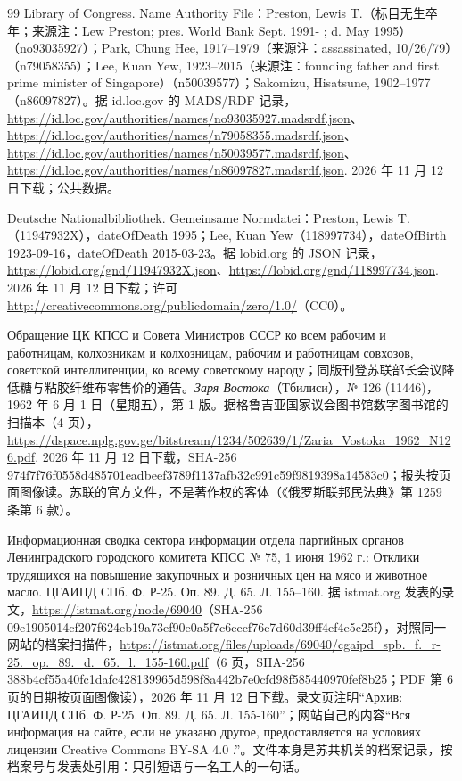 \begin{thebibliography}{99}
 Library of Congress. Name Authority File：Preston, Lewis T.（标目无生卒年；来源注：Lew Preston; pres. World Bank Sept. 1991- ; d. May 1995）（no93035927）；Park, Chung Hee, 1917--1979（来源注：assassinated, 10/26/79）（n79058355）；Lee, Kuan Yew, 1923--2015（来源注：founding father and first prime minister of Singapore）（n50039577）；Sakomizu, Hisatsune, 1902--1977（n86097827）。据 id.loc.gov 的 MADS/RDF 记录，\url{https://id.loc.gov/authorities/names/no93035927.madsrdf.json}、\url{https://id.loc.gov/authorities/names/n79058355.madsrdf.json}、\url{https://id.loc.gov/authorities/names/n50039577.madsrdf.json}、\url{https://id.loc.gov/authorities/names/n86097827.madsrdf.json}. 2026 年 11 月 12 日下载；公共数据。

 Deutsche Nationalbibliothek. Gemeinsame Normdatei：Preston, Lewis T.（11947932X），dateOfDeath 1995；Lee, Kuan Yew（118997734），dateOfBirth 1923-09-16，dateOfDeath 2015-03-23。据 lobid.org 的 JSON 记录，\url{https://lobid.org/gnd/11947932X.json}、\url{https://lobid.org/gnd/118997734.json}. 2026 年 11 月 12 日下载；许可 \url{http://creativecommons.org/publicdomain/zero/1.0/}（CC0）。

 Обращение ЦК КПСС и Совета Министров СССР ко всем рабочим и работницам, колхозникам и колхозницам, рабочим и работницам совхозов, советской интеллигенции, ко всему советскому народу；同版刊登苏联部长会议降低糖与粘胶纤维布零售价的通告。\emph{Заря Востока}（Тбилиси），№ 126 (11446)，1962 年 6 月 1 日（星期五），第 1 版。据格鲁吉亚国家议会图书馆数字图书馆的扫描本（4 页），\url{https://dspace.nplg.gov.ge/bitstream/1234/502639/1/Zaria_Vostoka_1962_N126.pdf}. 2026 年 11 月 12 日下载，SHA-256 974f7f76f0558d485701eadbeef3789f1137afb32c991c59f9819398a14583c0；报头按页面图像读。苏联的官方文件，不是著作权的客体（《俄罗斯联邦民法典》第 1259 条第 6 款）。

 Информационная сводка сектора информации отдела партийных органов Ленинградского городского комитета КПСС № 75, 1 июня 1962 г.: Отклики трудящихся на повышение закупочных и розничных цен на мясо и животное масло. ЦГАИПД СПб. Ф. Р-25. Оп. 89. Д. 65. Л. 155--160. 据 istmat.org 发表的录文，\url{https://istmat.org/node/69040}（SHA-256 09e1905014cf207f624eb19a73ef90e0a5f7c6eecf76e7d60d39ff4ef4e5c25f），对照同一网站的档案扫描件，\url{https://istmat.org/files/uploads/69040/cgaipd_spb._f._r-25._op._89._d._65._l._155-160.pdf}（6 页，SHA-256 388b4cf55a40fc1dafc428139965d598f8a442b7e0cfd98f585440970fef8b25；PDF 第 6 页的日期按页面图像读），2026 年 11 月 12 日下载。录文页注明“Архив: ЦГАИПД СПб. Ф. Р-25. Оп. 89. Д. 65. Л. 155-160”；网站自己的内容“Вся информация на сайте, если не указано другое, предоставляется на условиях лицензии Creative Commons BY-SA 4.0 .”。文件本身是苏共机关的档案记录，按档案号与发表处引用：只引短语与一名工人的一句话。


\end{thebibliography}
